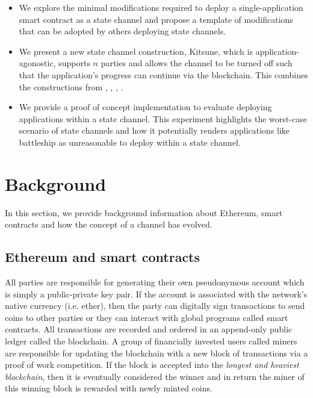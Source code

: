 \documentclass{llncs}
\begin{document}
	\begin{itemize}
		\item We explore the minimal modifications required to deploy a single-application smart contract as a state channel and propose a template of modifications that can be adopted by others deploying state channels. 
		\item We present a new state channel construction, \textsf{Kitsune}, which is application-agonostic, supports $n$ parties and allows the channel to be turned off such that the application's progress can continue via the blockchain. This combines the constructions from \cite{miller2017sprites}, \cite{mccorry2018pisa}, \cite{dziembowski2017perun}, \cite{croman2016scaling}. 
		\item We provide a proof of concept implementation to evaluate deploying applications within a state channel.
		This experiment highlights the worst-case scenario of state channels and how it potentially renders applications like battleship as unreasonable to deploy within a state channel. 
	\end{itemize}
	
	\section{Background}
	
	In this section, we provide background information about Ethereum, smart contracts and how the concept of a channel has evolved. 
	
	\subsection{Ethereum and smart contracts}
	
	All parties are responsible for generating their own pseudonymous account which is simply a public-private key pair. 
	If the account is associated with the network's native currency (i.e. ether), then the party can digitally sign transactions to send coins to other parties or they can interact with global programs called smart contracts. 
	All transactions are recorded and ordered in an append-only public ledger called the blockchain.
	A group of financially invested users called miners are responsible for updating the blockchain with a new block of transactions via a proof of work competition. 
	If the block is accepted into the \textit{longest and heaviest blockchain}, then it is eventually considered the winner and in return the miner of this winning block is rewarded with newly minted coins. 
	
\end{document}
